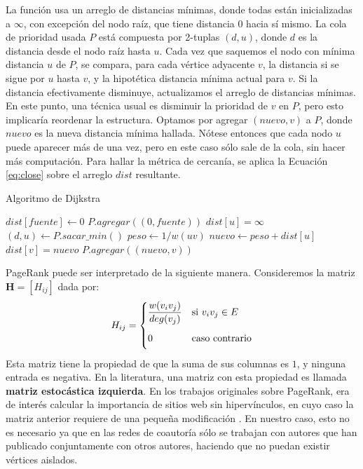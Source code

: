 \documentclass[journal]{IEEEtran}
\let\MYoriglatexcaption\caption
\renewcommand{\caption}[2][\relax]{\MYoriglatexcaption[#2]{#2}}
\newcommand{\matr}[1]{\mathbf{#1}} %
\begin{document}
La función  usa un arreglo de distancias mínimas, donde todas están inicializadas a \(\infty\), con excepción del nodo raíz, que tiene distancia \(0\) hacia sí mismo. La cola de prioridad usada \(P\) está compuesta por 2-tuplas \((d, u)\), donde \(d\) es la distancia desde el nodo raíz hasta \(u\). Cada vez que saquemos el nodo con mínima distancia \(u\) de \(P\), se compara, para cada vértice adyacente \(v\), la distancia si se sigue por \(u\) hasta \(v\), y la hipotética distancia mínima actual para \(v\). Si la distancia efectivamente disminuye, actualizamos el arreglo de distancias mínimas. En este punto, una técnica usual es disminuir la prioridad de \(v\) en \(P\)\cite{heap}, pero esto implicaría reordenar la estructura. Optamos por agregar \((nuevo, v)\) a \(P\), donde \(nuevo\) es la nueva distancia mínima hallada. Nótese entonces que cada nodo \(u\) puede aparecer más de una vez, pero en este caso sólo sale de la cola, sin hacer más computación. Para hallar la métrica de cercanía, se aplica la Ecuación \ref{eq:close} sobre el arreglo \(dist\) resultante.
\begin{algorithm}[H]
	\caption{Algoritmo de Dijkstra} \label{alg:dijkstra}
\begin{algorithmic}
		\State $dist[fuente] \gets 0$
		\State $P.agregar((0, fuente))$
			\State $dist[u] = \infty$
		\EndFor
			\State $(d, u) \gets P.sacar\_min()$
					\State $peso \gets 1/w(uv)$
					\State $nuevo \gets peso + dist[u]$
						\State $dist[v] = nuevo$
						\State $P.agregar((nuevo, v))$
					\EndIf
				\EndFor	
			\EndIf
		\EndWhile
	\EndFunction
\end{algorithmic}
\end{algorithm}

PageRank puede ser interpretado de la siguiente manera. Consideremos la matriz \(\matr{H} = [H_{ij}]\) dada por:
\begin{equation}
	H_{ij} =
	\begin{dcases}
	\frac{w(v_i v_j)}{deg(v_j)} &\text{si $v_i v_j \in E$}\\
	0\phantom{\frac{1}{|V|}} &\text{caso contrario}
	\end{dcases}
\end{equation}
Esta matriz tiene la propiedad de que la suma de sus columnas es \(1\), y ninguna entrada es negativa. En la literatura, una matriz con esta propiedad es llamada \textbf{matriz estocástica izquierda}. En los trabajos originales sobre PageRank, era de interés calcular la importancia de sitios web sin hipervínculos, en cuyo caso la matriz anterior requiere de una pequeña modificación \cite{google}. En nuestro caso, esto no es necesario ya que en las redes de coautoría sólo se trabajan con autores que han publicado conjuntamente con otros autores, haciendo que no puedan existir vértices aislados.
\end{document}
